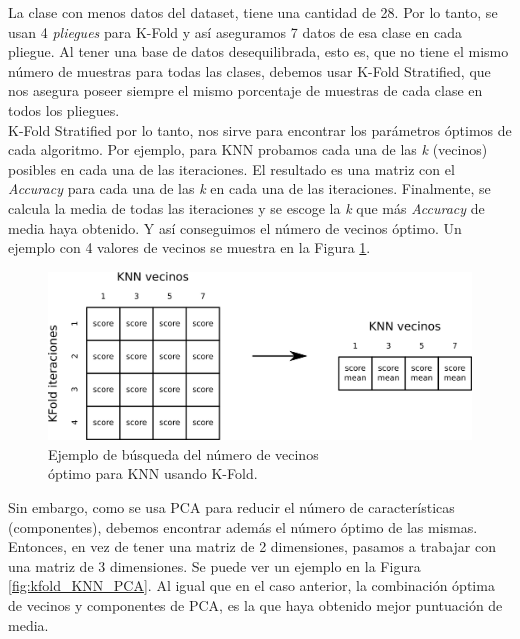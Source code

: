 La clase con menos datos del dataset, tiene una cantidad de 28. Por lo tanto, se usan 4 \textit{pliegues} para K-Fold y así aseguramos 7 datos de esa clase en cada pliegue. Al tener una base de datos desequilibrada, esto es, que no tiene el mismo número de muestras para todas las clases, debemos usar K-Fold Stratified, que nos asegura poseer siempre el mismo porcentaje de muestras de cada clase en todos los pliegues.\\

K-Fold Stratified por lo tanto, nos sirve para encontrar los parámetros óptimos de cada algoritmo. Por ejemplo, para KNN probamos cada una de las \textit{k} (vecinos) posibles en cada una de las iteraciones. El resultado es una matriz con el \textit{Accuracy} para cada una de las \textit{k} en cada una de las iteraciones. Finalmente, se calcula la media de todas las iteraciones y se escoge la \textit{k} que más \textit{Accuracy} de media haya obtenido. Y así conseguimos el número de vecinos óptimo. Un ejemplo con 4 valores de vecinos se muestra en la Figura \ref{fig:kfold_KNN}.\\

\begin{figure} [h!]
  \begin{center}
    \includegraphics[width=13cm]{figs/KFold_KNN.png}
  \end{center}
  \captionsetup{justification=centering}
  \caption{Ejemplo de búsqueda del número de vecinos\\
  óptimo para KNN usando K-Fold.}
  \label{fig:kfold_KNN}
\end{figure}

Sin embargo, como se usa PCA para reducir el número de características (componentes), debemos encontrar además el número óptimo de las mismas. Entonces, en vez de tener una matriz de 2 dimensiones, pasamos a trabajar con una matriz de 3 dimensiones. Se puede ver un ejemplo en la Figura \ref{fig:kfold_KNN_PCA}. Al igual que en el caso anterior, la combinación óptima de vecinos y componentes de PCA, es la que haya obtenido mejor puntuación de media.\\

